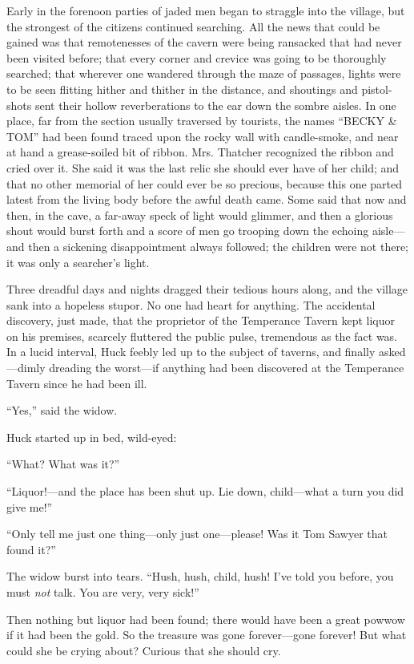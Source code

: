 \documentclass{book}
\begin{document}
Early in the forenoon parties of jaded men began to straggle into the village, but the strongest of the citizens continued searching. All the news that could be gained was that remotenesses of the cavern were being ransacked that had never been visited before; that every corner and crevice was going to be thoroughly searched; that wherever one wandered through the maze of passages, lights were to be seen flitting hither and thither in the distance, and shoutings and pistol-shots sent their hollow reverberations to the ear down the sombre aisles. In one place, far from the section usually traversed by tourists, the names “BECKY \& TOM” had been found traced upon the rocky wall with candle-smoke, and near at hand a grease-soiled bit of ribbon. Mrs. Thatcher recognized the ribbon and cried over it. She said it was the last relic she should ever have of her child; and that no other memorial of her could ever be so precious, because this one parted latest from the living body before the awful death came. Some said that now and then, in the cave, a far-away speck of light would glimmer, and then a glorious shout would burst forth and a score of men go trooping down the echoing aisle—and then a sickening disappointment always followed; the children were not there; it was only a searcher’s light.

Three dreadful days and nights dragged their tedious hours along, and the village sank into a hopeless stupor. No one had heart for anything. The accidental discovery, just made, that the proprietor of the Temperance Tavern kept liquor on his premises, scarcely fluttered the public pulse, tremendous as the fact was. In a lucid interval, Huck feebly led up to the subject of taverns, and finally asked—dimly dreading the worst—if anything had been discovered at the Temperance Tavern since he had been ill.

“Yes,” said the widow.

Huck started up in bed, wild-eyed:

“What? What was it?”

“Liquor!—and the place has been shut up. Lie down, child—what a turn you did give me!”

“Only tell me just one thing—only just one—please! Was it Tom Sawyer that found it?”

The widow burst into tears. “Hush, hush, child, hush! I’ve told you before, you must \emph{not} talk. You are very, very sick!”

Then nothing but liquor had been found; there would have been a great powwow if it had been the gold. So the treasure was gone forever—gone forever! But what could she be crying about? Curious that she should cry.
\end{document}
